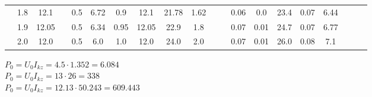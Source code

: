 \documentclass[a4paper,12pt]{article}
\newcommand{\uo}{U_0}
\newcommand{\ik}{I_{kz}}
\newcommand{\po}{P_0}
\begin{document}
\begin{table}[htbp]
\begin{tabular}{|c|c|c|c|c|c|c|c|c|c|c|c|c|c|c|c|c|c|c|c|}
			& 1.8        & 12.1       &                       & 0.5           & 6.72          & 0.9           & 12.1          & 21.78         & 1.62          &                        &                         & 0.06               & 0.0                & 23.4       & 0.07            & 6.44                &                       &                       &                       \\ \cline{2-3} \cline{5-10} \cline{13-17}
			& 1.9        & 12.05      &                       & 0.5           & 6.34          & 0.95          & 12.05         & 22.9          & 1.8           &                        &                         & 0.07               & 0.01               & 24.7       & 0.07            & 6.77                &                       &                       &                       \\ \cline{2-3} \cline{5-10} \cline{13-17}
			& 2.0        & 12.0       &                       & 0.5           & 6.0           & 1.0           & 12.0          & 24.0          & 2.0           &                        &                         & 0.07               & 0.01               & 26.0       & 0.08            & 7.1                 &                       &                       &                       \\ \hline
		\end{tabular}%
	\end{table}

	$\po=\uo\ik=4.5\cdot1.352=6.084$\\
	$\po=\uo\ik=13\cdot26=338$\\
	$\po=\uo\ik=12.13\cdot50.243=609.443$\\
	
	
	
\end{document}
